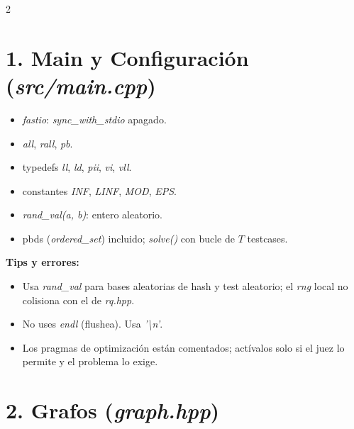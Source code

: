 \documentclass[10pt]{article}
\begin{document}
\begin{multicols}{2}
\section*{1. Main y Configuración (\textit{src/main.cpp})}
\begin{itemize}\setlength{\itemsep}{1pt}
  \item \textit{fastio}: \textit{sync\_with\_stdio} apagado.
  \item \textit{all}, \textit{rall}, \textit{pb}.
  \item typedefs \textit{ll}, \textit{ld}, \textit{pii}, \textit{vi}, \textit{vll}.
  \item constantes \textit{INF}, \textit{LINF}, \textit{MOD}, \textit{EPS}.
  \item \textit{rand\_val(a, b)}: entero aleatorio.
  \item pbds (\textit{ordered\_set}) incluido; \textit{solve()} con bucle de $T$ testcases.
\end{itemize}

\textbf{Tips y errores:}
\begin{itemize}\setlength{\itemsep}{1pt}
  \item Usa \textit{rand\_val} para bases aleatorias de hash y test aleatorio; el \textit{rng} local no colisiona con el de \textit{rq.hpp}.
  \item No uses \textit{endl} (flushea). Usa \textit{'\textbackslash n'}.
  \item Los pragmas de optimización están comentados; actívalos solo si el juez lo permite y el problema lo exige.
\end{itemize}

\section*{2. Grafos (\textit{graph.hpp})}


\end{multicols}
\end{document}

